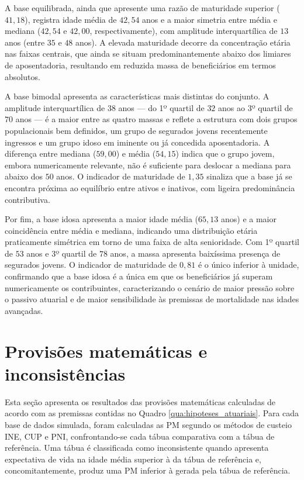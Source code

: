 A base equilibrada, ainda que apresente uma razão de maturidade superior ($41{,}18$), registra idade média de $42{,}54$ anos e a maior simetria entre média e mediana ($42{,}54$ e $42{,}00$, respectivamente), com amplitude interquartílica de $13$ anos (entre $35$ e $48$ anos). A elevada maturidade decorre da concentração etária nas faixas centrais, que ainda se situam predominantemente abaixo dos limiares de aposentadoria, resultando em reduzida massa de beneficiários em termos absolutos.

A base bimodal apresenta as características mais distintas do conjunto. A amplitude interquartílica de $38$ anos --- do 1º quartil de $32$ anos ao 3º quartil de $70$ anos --- é a maior entre as quatro massas e reflete a estrutura com dois grupos populacionais bem definidos, um grupo de segurados jovens recentemente ingressos e um grupo idoso em iminente ou já concedida aposentadoria. A diferença entre mediana ($59{,}00$) e média ($54{,}15$) indica que o grupo jovem, embora numericamente relevante, não é suficiente para deslocar a mediana para abaixo dos $50$ anos. O indicador de maturidade de $1{,}35$ sinaliza que a base já se encontra próxima ao equilíbrio entre ativos e inativos, com ligeira predominância contributiva.

Por fim, a base idosa apresenta a maior idade média ($65{,}13$ anos) e a maior coincidência entre média e mediana, indicando uma distribuição etária praticamente simétrica em torno de uma faixa de alta senioridade. Com 1º quartil de $53$ anos e 3º quartil de $78$ anos, a massa apresenta baixíssima presença de segurados jovens. O indicador de maturidade de $0{,}81$ é o único inferior à unidade, confirmando que a base idosa é a única em que os beneficiários já superam numericamente os contribuintes, caracterizando o cenário de maior pressão sobre o passivo atuarial e de maior sensibilidade às premissas de mortalidade nas idades avançadas.

\section{\textbf{Provisões matemáticas e inconsistências}}

Esta seção apresenta os resultados das provisões matemáticas calculadas de acordo com as premissas contidas no Quadro \ref{qua:hipoteses_atuariais}. Para cada base de dados simulada, foram calculadas as PM segundo os métodos de custeio INE, CUP e PNI, confrontando-se cada tábua comparativa com a tábua de referência. Uma tábua é classificada como inconsistente quando apresenta expectativa de vida na idade média superior à da tábua de referência e, concomitantemente, produz uma PM inferior à gerada pela tábua de referência.

